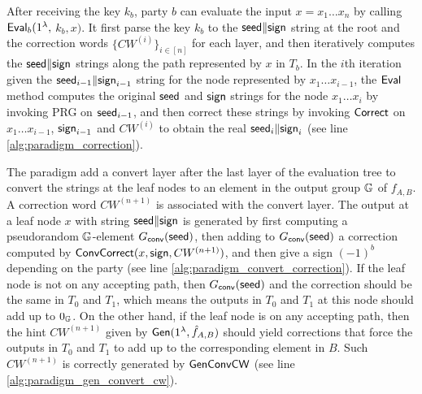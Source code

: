 After receiving the key $k_b$, party $b$ can evaluate the input $x=x_1\dots x_n$ by calling ${\sf Eval}_b(1^\lambda,$ $k_b,x)$. It first parse the key $k_b$ to the ${\sf seed}\|{\sf sign}$ string at the root and the correction words $\{CW^{(i)}\}_{i\in[n]}$ for each layer, and then iteratively computes the ${\sf seed}\|{\sf sign}$ strings along the path represented by $x$ in $T_b$. In the $i$th iteration given the ${\sf seed}_{i-1}\|{\sf sign}_{i-1}$ string for the node represented by $x_1\dots x_{i-1}$, the ${\sf Eval}$ method computes the original ${\sf seed}$ and ${\sf sign}$ strings for the node $x_1\dots x_{i}$ by invoking PRG on ${\sf seed}_{i-1}$, and then correct these strings by invoking ${\sf Correct}$ on $x_1\dots x_{i-1}$, ${\sf sign}_{i-1}$ and $CW^{(i)}$ to obtain the real ${\sf seed}_i\|{\sf sign}_i$ (see line \ref{alg:paradigm_correction}).  

The paradigm add a convert layer after the last layer of the evaluation tree to convert the strings at the leaf nodes to an element in the output group $\mathbb{G}$ of $f_{A,B}$. A correction word $CW^{(n+1)}$ is associated with the convert layer. The output at a leaf node $x$ with string ${\sf seed}\|{\sf sign}$ is generated by first computing a pseudorandom $\mathbb{G}$-element $G_{\sf conv}({\sf seed})$, then adding to $G_{\sf conv}({\sf seed})$ a correction computed by ${\sf ConvCorrect}(x, {\sf sign}, CW^{(n+1)})$, and then give a sign $(-1)^b$ depending on the party (see line \ref{alg:paradigm_convert_correction}). If the leaf node is not on any accepting path, then $G_{\sf conv}({\sf seed})$ and the correction should be the same in $T_0$ and $T_1$, which means the outputs in $T_0$ and $T_1$ at this node should add up to $0_{\mathbb{G}}$. On the other hand, if the leaf node is on any accepting path, then the hint $CW^{(n+1)}$ given by ${\sf Gen}(1^\lambda, \hat{f}_{A,B})$ should yield corrections that force the outputs in $T_0$ and $T_1$ to add up to the corresponding element in $B$. Such $CW^{(n+1)}$ is correctly generated by $\sf GenConvCW$ (see line \ref{alg:paradigm_gen_convert_cw}). 

